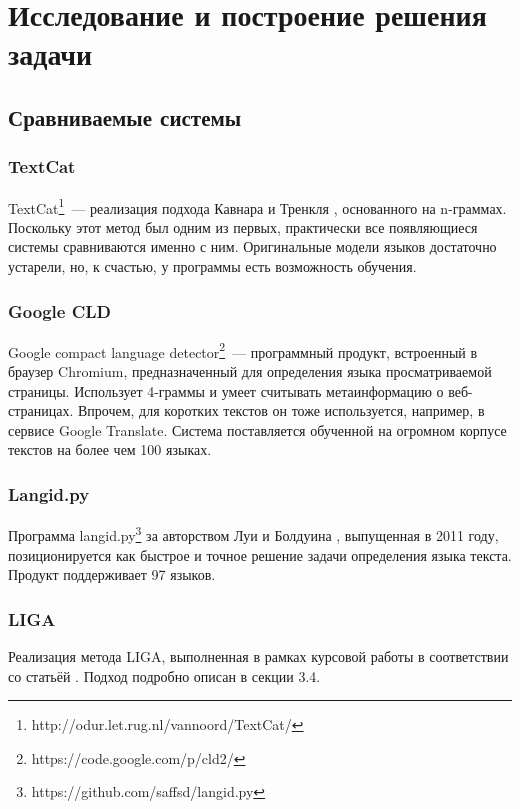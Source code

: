 \documentclass[a4paper, 14pt]{article}
\begin{document}
\pagebreak

\section{Исследование и построение решения задачи}
		\subsection{Сравниваемые системы}
			\subsubsection{TextCat}
			TextCat\footnote{http://odur.let.rug.nl/vannoord/TextCat/}~--- реализация подхода Кавнара и Тренкля \cite{canvar}, основанного на n-граммах.
			Поскольку этот метод был одним из первых, практически все появляющиеся системы сравниваются именно
			с ним. 
			Оригинальные модели языков достаточно устарели, но, к счастью, у программы есть возможность обучения.
			\subsubsection{Google CLD}
			Google compact language detector\footnote{https://code.google.com/p/cld2/}~--- программный продукт, встроенный в браузер Chromium, 
			предназначенный для определения языка просматриваемой страницы. 
			Использует 4-граммы и умеет считывать метаинформацию
			о веб-страницах. Впрочем, для коротких текстов он тоже используется, например, в сервисе Google Translate. Система поставляется обученной
			на огромном корпусе текстов на более чем 100 языках.
			\subsubsection{Langid.py}
			Программа langid.py\footnote{https://github.com/saffsd/langid.py} за авторством Луи и Болдуина \cite{langid}, выпущенная в 2011 году, позиционируется
			как быстрое и точное решение задачи определения языка текста. Продукт поддерживает 97 языков.
			\subsubsection{LIGA}
			Реализация метода LIGA, выполненная в рамках курсовой работы в соответствии со статьёй \cite{liga}. Подход подробно описан в секции 3.4.
\end{document}
